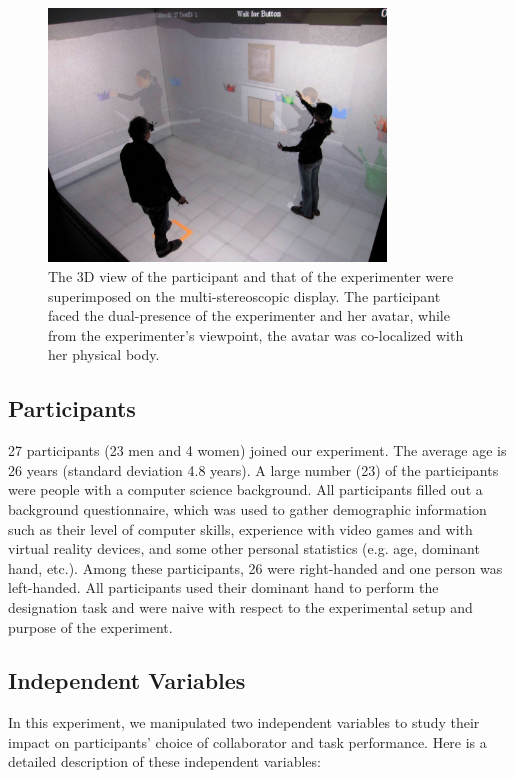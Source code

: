 \begin{figure}[htb]
  \centering
  \includegraphics[width=0.8\textwidth]{figures/ch3/demo}
  \caption{\label{fig:3_demo}The 3D view of the participant and that of the experimenter were superimposed on the multi-stereoscopic display. The participant faced the dual-presence of the experimenter and her avatar, while from the experimenter's viewpoint, the avatar was co-localized with her physical body.}
\end{figure}


\subsection{Participants}
27 participants (23 men and 4 women) joined our experiment. The average age is 26 years (standard deviation 4.8 years).
A large number (23) of the participants were people with a computer science background. All participants filled out a background questionnaire, which was used to gather demographic information such as their level of computer skills, experience with video games and with virtual reality devices, and some other personal statistics (e.g. age, dominant hand, etc.). Among these participants, 26 were right-handed and one person was left-handed. All participants used their dominant hand to perform the designation task and were naive with respect to the experimental setup and purpose of the experiment.


\subsection{Independent Variables}
In this experiment, we manipulated two independent variables to study their impact on participants' choice of collaborator and task performance. Here is a detailed description of these independent variables:

